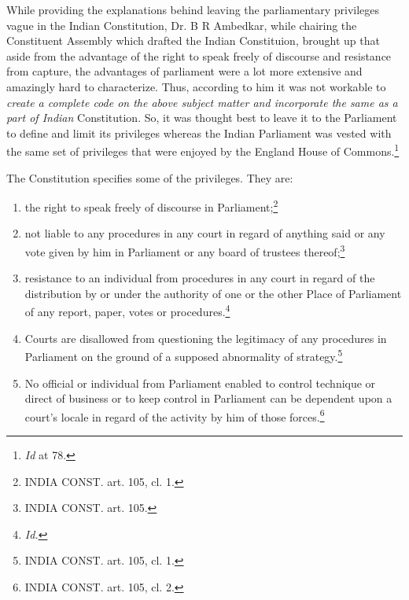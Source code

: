 \begin{multicols}{2}
\vspace{-.2cm}

\noi
While providing the explanations behind leaving the parliamentary privileges vague in the
Indian Constitution, Dr. B R Ambedkar, while chairing the Constituent Assembly which
drafted the Indian Constituion, brought up that aside from the advantage of the right to speak 
freely of discourse and resistance from capture, the advantages of parliament were a lot more
extensive and amazingly hard to characterize. Thus, according to him it was not workable to
\textit{create a complete code on the above subject matter and incorporate the same as a part of
Indian} Constitution. So, it was thought best to leave it to the Parliament to define and limit its
privileges whereas the Indian Parliament was vested with the same set of privileges that were
enjoyed by the England House of Commons.\footnote{\textit{Id} at 78.}

\noi
The Constitution specifies some of the privileges. They are:

\vspace{-.3cm}

\begin{enumerate}[label=$\bullet$]

\itemsep=0pt

\item the right to speak freely of discourse in Parliament;\footnote{INDIA CONST. art. 105, cl. 1.}

\item not liable to any procedures in any court in regard of anything said or any vote
given by him in Parliament or any board of trustees thereof;\footnote{INDIA CONST. art. 105.}

\item  resistance to an individual from procedures in any court in regard of the
distribution by or under the authority of one or the other Place of Parliament of
any report, paper, votes or procedures.\footnote{\textit{Id.}}

\newpage

\item  Courts are disallowed from questioning the legitimacy of any procedures in
Parliament on the ground of a supposed abnormality of strategy.\footnote{INDIA CONST. art. 105, cl. 1.}

\item  No official or individual from Parliament enabled to control technique or
direct of business or to keep control in Parliament can be dependent upon a
court's locale in regard of the activity by him of those forces.\footnote{INDIA CONST. art. 105, cl. 2.}


\end{enumerate}
\end{multicols}

